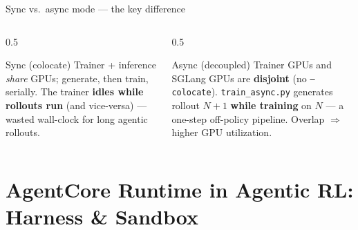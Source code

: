 \documentclass[aspectratio=169]{beamer}
\begin{document}
\begin{frame}{Sync vs.\ async mode --- the key difference}
  \begin{columns}[T]
    \begin{column}{0.5\textwidth}
      \begin{block}{Sync (colocate)}
        \scriptsize Trainer + inference \emph{share} GPUs; generate, then train, serially.
        The trainer \textbf{idles while rollouts run} (and vice-versa) --- wasted wall-clock
        for long agentic rollouts.
      \end{block}
    \end{column}
    \begin{column}{0.5\textwidth}
      \begin{block}{Async (decoupled)}
        \scriptsize Trainer GPUs and SGLang GPUs are \textbf{disjoint} (no \texttt{--colocate}).
        \texttt{train\_async.py} generates rollout $N{+}1$ \textbf{while training} on $N$ ---
        a one-step off-policy pipeline. Overlap $\Rightarrow$ higher GPU utilization.
      \end{block}
    \end{column}
  \end{columns}
  \vspace{0.2em}
  \begin{center}
  \end{center}
\end{frame}

\section{AgentCore Runtime in Agentic RL: Harness \& Sandbox}
\end{document}
